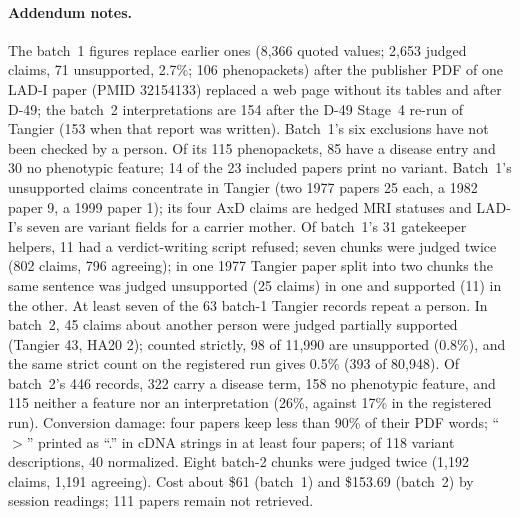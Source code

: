 \documentclass{article} %
\begin{document}
\paragraph{Addendum notes.} The batch~1 figures replace earlier ones (8,366 quoted values; 2,653 judged claims, 71 unsupported, 2.7\%; 106 phenopackets) after the publisher PDF of one LAD-I paper (PMID 32154133) replaced a web page without its tables and after D-49; the batch~2 interpretations are 154 after the D-49 Stage~4 re-run of Tangier (153 when that report was written). Batch~1's six exclusions have not been checked by a person. Of its 115 phenopackets, 85 have a disease entry and 30 no phenotypic feature; 14 of the 23 included papers print no variant. Batch~1's unsupported claims concentrate in Tangier (two 1977 papers 25 each, a 1982 paper 9, a 1999 paper 1); its four AxD claims are hedged MRI statuses and LAD-I's seven are variant fields for a carrier mother. Of batch~1's 31 gatekeeper helpers, 11 had a verdict-writing script refused; seven chunks were judged twice (802 claims, 796 agreeing); in one 1977 Tangier paper split into two chunks the same sentence was judged unsupported (25 claims) in one and supported (11) in the other. At least seven of the 63 batch-1 Tangier records repeat a person. In batch~2, 45 claims about another person were judged partially supported (Tangier 43, HA20 2); counted strictly, 98 of 11,990 are unsupported (0.8\%), and the same strict count on the registered run gives 0.5\% (393 of 80,948). Of batch~2's 446 records, 322 carry a disease term, 158 no phenotypic feature, and 115 neither a feature nor an interpretation (26\%, against 17\% in the registered run). Conversion damage: four papers keep less than 90\% of their PDF words; ``$>$'' printed as ``.'' in cDNA strings in at least four papers; of 118 variant descriptions, 40 normalized. Eight batch-2 chunks were judged twice (1,192 claims, 1,191 agreeing). Cost about \$61 (batch~1) and \$153.69 (batch~2) by session readings; 111 papers remain not retrieved.
\end{document}
